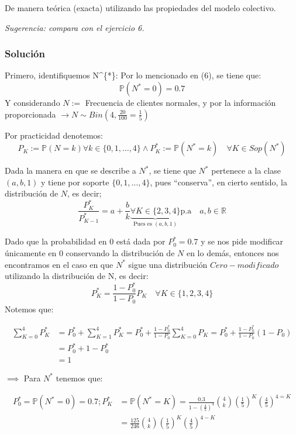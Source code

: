 \documentclass[
]{article}
\begin{document}
De manera teórica (exacta) utilizando las propiedades del modelo
colectivo.

\emph{Sugerencia: compara con el ejercicio 6.}

\hypertarget{soluciuxf3n-6}{%
\subsubsection{Solución}\label{soluciuxf3n-6}}

Primero, identifiquemos N\^{}\{*\}: Por lo mencionado en (6), se tiene
que: \[\mathbb{P}(N^{*} = 0) = 0.7\] Y considerando \(N :=\) Frecuencia
de clientes normales, y por la información proporcionada
\(\rightarrow N \sim Bin(4, \frac{20}{100}= \frac{1}{5})\)

Por practicidad denotemos:
\[P_{K} := \mathbb{P}(N = k) \forall k \in \{0,1, \dots, 4\} \land P_{K}^{*}:= \mathbb{P}(N^{*} = k) \quad \forall K \in Sop(N^{*})\]

Dada la manera en que se describe a \(N^{*}\), se tiene que \(N^{*}\)
pertenece a la clase \((a,b,1)\) y tiene por soporte
\(\{0,1,\dots,4\}\), pues ``conserva'', en cierto sentido, la
distribución de \(N\), es decir;
\[\frac{P_{K}^{*}}{P_{K-1}^{*}} = a + \frac{b}{k} \underbrace{\forall K \in \{2,3,4\}}_{\text{Pues es }(a,b,1)} \text{p.a}\quad a,b \in \mathbb{R}\]

Dado que la probabilidad en 0 está dada por \(P_{0}^{*} = 0.7\) y se nos
pide modificar únicamente en 0 conservando la distribución de \(N\) en
lo demás, entonces nos encontramos en el caso en que \(N^{*}\) sigue una
distribución \(Cero-modificado\) utilizando la distribución de N, es
decir:
\[P_{K}^{*} = \frac{1 - P_{0}^{*}}{1 - P_{0}} P_{K} \quad \forall K\in \{1,2,3,4\}\]
Notemos que:

\begin{align*}
\sum_{K = 0}^{4}P_{K}^{*} &= P_{0}^{*} + \sum_{K = 1}^{4}P_{K}^{*} = P_{0}^{*} + \frac{1 - P_{0}^{*}}{1 - P_{0}} \sum_{K = 0}^{4} P_{K} = P_{0}^{*} + \frac{1 - P_{0}^{*}}{1 - P_{0}}(1 - P_{0})\\
&= P_{0}^{*} + 1 - P_{0}^{*}\\
&= 1
\end{align*}

\(\implies\) Para \(N^{*}\) tenemos que:

\begin{align*}
P_{0}^{*} = \mathbb{P}(N^{*} = 0) = 0.7; P_{K}^{*} &= \mathbb{P}(N^{*} = K) = \frac{0.3}{1 - \left(\frac{4}{5}\right)^{4}} \binom{4}{k} \left(\frac{1}{5}\right)^{K} \left(\frac{4}{5}\right)^{4 = K}\\
&= \frac{125}{246} \binom{4}{k} \left(\frac{1}{5}\right)^{K} \left(\frac{4}{5}\right)^{4 - K}
\end{align*}
\end{document}

